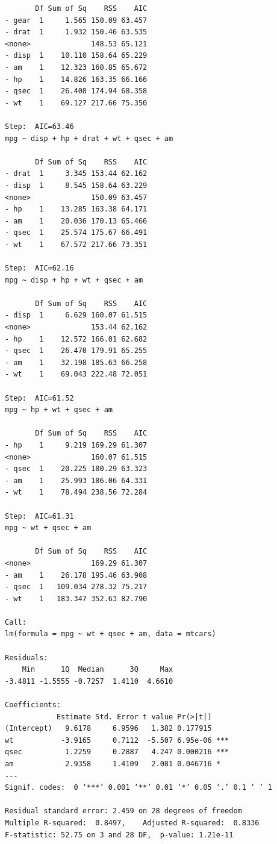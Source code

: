 \documentclass{article}\usepackage[]{graphicx}\usepackage[]{xcolor}
\begin{document}
\begin{verbatim}
       Df Sum of Sq    RSS    AIC
- gear  1     1.565 150.09 63.457
- drat  1     1.932 150.46 63.535
<none>              148.53 65.121
- disp  1    10.110 158.64 65.229
- am    1    12.323 160.85 65.672
- hp    1    14.826 163.35 66.166
- qsec  1    26.408 174.94 68.358
- wt    1    69.127 217.66 75.350

Step:  AIC=63.46
mpg ~ disp + hp + drat + wt + qsec + am

       Df Sum of Sq    RSS    AIC
- drat  1     3.345 153.44 62.162
- disp  1     8.545 158.64 63.229
<none>              150.09 63.457
- hp    1    13.285 163.38 64.171
- am    1    20.036 170.13 65.466
- qsec  1    25.574 175.67 66.491
- wt    1    67.572 217.66 73.351

Step:  AIC=62.16
mpg ~ disp + hp + wt + qsec + am

       Df Sum of Sq    RSS    AIC
- disp  1     6.629 160.07 61.515
<none>              153.44 62.162
- hp    1    12.572 166.01 62.682
- qsec  1    26.470 179.91 65.255
- am    1    32.198 185.63 66.258
- wt    1    69.043 222.48 72.051

Step:  AIC=61.52
mpg ~ hp + wt + qsec + am

       Df Sum of Sq    RSS    AIC
- hp    1     9.219 169.29 61.307
<none>              160.07 61.515
- qsec  1    20.225 180.29 63.323
- am    1    25.993 186.06 64.331
- wt    1    78.494 238.56 72.284

Step:  AIC=61.31
mpg ~ wt + qsec + am

       Df Sum of Sq    RSS    AIC
<none>              169.29 61.307
- am    1    26.178 195.46 63.908
- qsec  1   109.034 278.32 75.217
- wt    1   183.347 352.63 82.790

Call:
lm(formula = mpg ~ wt + qsec + am, data = mtcars)

Residuals:
    Min      1Q  Median      3Q     Max 
-3.4811 -1.5555 -0.7257  1.4110  4.6610 

Coefficients:
            Estimate Std. Error t value Pr(>|t|)    
(Intercept)   9.6178     6.9596   1.382 0.177915    
wt           -3.9165     0.7112  -5.507 6.95e-06 ***
qsec          1.2259     0.2887   4.247 0.000216 ***
am            2.9358     1.4109   2.081 0.046716 *  
---
Signif. codes:  0 ‘***’ 0.001 ‘**’ 0.01 ‘*’ 0.05 ‘.’ 0.1 ‘ ’ 1

Residual standard error: 2.459 on 28 degrees of freedom
Multiple R-squared:  0.8497,	Adjusted R-squared:  0.8336 
F-statistic: 52.75 on 3 and 28 DF,  p-value: 1.21e-11
\end{verbatim}
\end{document}
